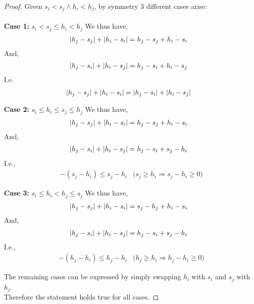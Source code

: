 \documentclass[12pt]{article}
\newenvironment{question}[2][Question]{\begin{trivlist}
\item[\hskip \labelsep {\bfseries #1}\hskip \labelsep {\bfseries #2.}]}{\end{trivlist}}
\DeclarePairedDelimiter\abs{\lvert}{\rvert}%
\begin{document}
\begin{question}{2 (a)}
  \begin{proof}
    Given $s_{i} < s_{j} \land h_{i} < h_{j}$, by symmetry 3 different cases arise: \\ \\
    \textbf{Case 1:} $s_{i} < s_{j} \leq h_{i} < h_{j}$
    We thus have,
    \begin{align*}
      \abs{h_{j} - s_{j}} + \abs{h_{i} - s_{i}} = h_{j} - s_{j} + h_{i} - s_{i}
    \end{align*}
    And,
    \begin{align*}
      \abs{h_{j} - s_{i}} + \abs{h_{i} - s_{j}} = h_{j} - s_{i} + h_{i} - s_{j}
    \end{align*}
    I.e.
    \begin{align*}
      \abs{h_{j} - s_{j}} + \abs{h_{i} - s_{i}} = \abs{h_{j} - s_{i}} + \abs{h_{i} - s_{j}}
    \end{align*}

    \textbf{Case 2:} $s_{i} \leq h_{i} \leq s_{j} \leq h_{j}$
    We thus have,
    \begin{align*}
      \abs{h_{j} - s_{j}} + \abs{h_{i} - s_{i}} = h_{j} - s_{j} + h_{i} - s_{i}
    \end{align*}
    And,
    \begin{align*}
      \abs{h_{j} - s_{i}} + \abs{h_{i} - s_{j}} = h_{j} - s_{i} + s_{j} - h_{i}
    \end{align*}
    I.e.,
    \begin{align*}
      & -(s_{j} - h_{i}) \leq s_{j} - h_{i} & \text{($s_{j} \geq h_{i} \Rightarrow s_{j} - h_{i} \geq 0$)}
    \end{align*}

    \textbf{Case 3:} $s_{i} \leq h_{i} < h_{j} \leq s_{j}$
    We thus have,
    \begin{align*}
      \abs{h_{j} - s_{j}} + \abs{h_{i} - s_{i}} = s_{j} - h_{j} + h_{i} - s_{i}
    \end{align*}
    And,
    \begin{align*}
      \abs{h_{j} - s_{i}} + \abs{h_{i} - s_{j}} = h_{j} - s_{i} + s_{j} - h_{i}
    \end{align*}
    I.e.,
    \begin{align*}
      & -(h_{j} - h_{i}) \leq h_{j} - h_{i} & \text{($h_{j} \geq h_{i} \Rightarrow h_{j} - h_{i} \geq 0$)}
    \end{align*}

    The remaining cases can be expressed by simply swapping $h_{i}$ with
    $s_{i}$ and $s_{j}$ with $h_{j}$. \\
    Therefore the statement holds true for all cases.
  \end{proof}
\end{question}
\end{document}
